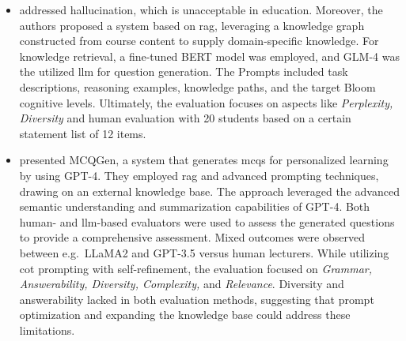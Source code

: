 \begin{itemize}
    \item \cite{yang_heuristic_2024} addressed hallucination, which is unacceptable in education. Moreover, the authors proposed a system based on \ac{rag}, leveraging a knowledge graph constructed from course content to supply domain-specific knowledge. For knowledge retrieval, a fine-tuned BERT model was employed, and GLM-4 \cite{glm_chatglm_2024} was the utilized \ac{llm} for question generation. The Prompts included task descriptions, reasoning examples, knowledge paths, and the target Bloom cognitive levels. Ultimately, the evaluation focuses on aspects like \textit{Perplexity, Diversity} and human evaluation with 20 students based on a certain statement list of 12 items.
    \item \cite{hang_mcqgen_2024} presented MCQGen, a system that generates \ac{mcqs} for personalized learning by using GPT-4. They employed \ac{rag} and advanced prompting techniques, drawing on an external knowledge base. The approach leveraged the advanced semantic understanding and summarization capabilities of GPT-4. Both human- and \ac{llm}-based evaluators were used to assess the generated questions to provide a comprehensive assessment. Mixed outcomes were observed between e.g.\ LLaMA2 and GPT-3.5 versus human lecturers. While utilizing \ac{cot} prompting with self-refinement, the evaluation focused on \textit{Grammar, Answerability, Diversity, Complexity,} and \textit{Relevance}. Diversity and answerability lacked in both evaluation methods, suggesting that prompt optimization and expanding the knowledge base could address these limitations. 
\end{itemize}



